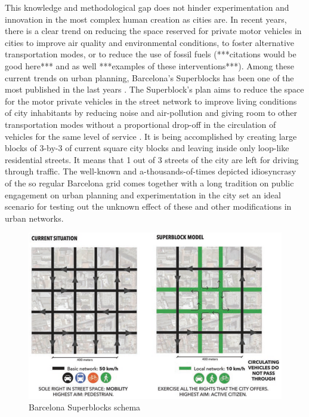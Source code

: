 \documentclass[11pt]{article}
\begin{document}
This knowledge and methodological gap does not hinder experimentation and innovation in the most complex human creation \citep{Levi-Strauss1955} as cities are. In recent years, there is a clear trend on reducing the space reserved for private motor vehicles in cities to improve air quality and environmental conditions, to foster alternative transportation modes, or to reduce the use of fossil fuels (***citations would be good here*** and as well ***examples of these interventions***). Among these current trends on urban planning, Barcelona's Superblocks has been one of the most published in the last years \citep{Bausells2016, Hu2016, Morel2019, Wiedeman2018}. The Superblock's plan aims to reduce the space for the motor private vehicles in the street network to improve living conditions of city inhabitants by reducing noise and air-pollution and giving room to other transportation modes without a proportional drop-off in the circulation of vehicles for the same level of service \citep{Rueda2018}. It is being accomplished by creating large blocks of 3-by-3 of current square city blocks and leaving inside only loop-like residential streets. It means that 1 out of 3 streets of the city are left for driving through traffic. The well-known and a-thousands-of-times depicted idiosyncrasy of the so regular Barcelona grid comes together with a long tradition on public engagement on urban planning and experimentation in the city set an ideal scenario for testing out the unknown effect of these and other modifications in urban networks.

\begin{figure}[h]
\centering
\includegraphics[scale=0.5]{bcn_superblocks_rueda_2018.png}
\caption{Barcelona Superblocks schema \citep{Rueda2018}}
\label{fig:Barcelona Superblocks schema}
\end{figure}
\end{document}
